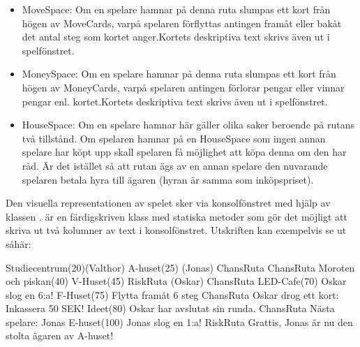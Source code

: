 \begin{itemize}
\item MoveSpace: Om en spelare hamnar på denna ruta slumpas ett kort från högen av MoveCards, varpå spelaren förflyttas antingen framåt eller bakåt det antal steg som kortet anger.Kortets deskriptiva text skrivs även ut i spelfönstret.
\item MoneySpace: Om en spelare hamnar på denna ruta slumpas ett kort från högen av MoneyCards, varpå spelaren antingen förlorar pengar eller vinnar pengar enl. kortet.Kortets deskriptiva text skrivs även ut i spelfönstret.
\item HouseSpace: Om en spelare hamnar här gäller olika saker beroende på rutans två tillstånd. Om spelaren hamnar på en HouseSpace som ingen annan spelare har köpt upp skall spelaren få möjlighet att köpa denna om den har råd. Är det istället så att rutan ägs av en annan spelare den nuvarande spelaren betala hyra till ägaren (hyran är samma som inköpspriset). 
\end{itemize}


Den visuella representationen av spelet sker via konsolfönstret med hjälp av klassen .  är en färdigskriven klass med statiska metoder som gör det möjligt att skriva ut två kolumner av text i konsolfönstret. Utskriften kan exempelvis se ut såhär:

\begin{REPL}
Studiecentrum(20)(Valthor)
A-huset(25) (Jonas)                                                                                                          
ChansRuta                                                                                                             
ChansRuta                                                                                                              
Moroten och piskan(40)
V-Huset(45)                                                                                                        
RiskRuta (Oskar)                                                                                                         
ChansRuta                                                                                                        
LED-Cafe(70)               Oskar slog en 6:a!                                           
F-Huset(75)                Flytta framåt 6 steg                                        
ChansRuta                  Oskar drog ett kort: Inkassera 50 SEK!
Ideet(80)                  Oskar har avslutat sin runda.                              
ChansRuta                  Nästa spelare: Jonas                                      
E-huset(100)               Jonas slog en 1:a!                                       
RiskRuta                   Grattis, Jonas är nu den stolta ägaren av A-huset!
\end{REPL}

